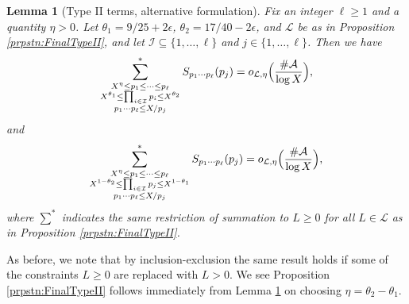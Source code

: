 \documentclass[10pt]{amsart}
\theoremstyle{plain}
\newtheorem{lmm}[thrm]{Lemma}
\numberwithin{sblmm}{thrm}
\numberwithin{equation}{section}
\begin{document}
\begin{lmm}[Type II terms, alternative formulation]\label{lmm:AltTypeII}
%
Fix an integer $\ell\ge1$ and a quantity $\eta>0$. Let $\theta_1=9/25+2\epsilon$, $\theta_2=17/40-2\epsilon$, and $\mathcal{L}$ be as in Proposition \ref{prpstn:FinalTypeII}, and let $\mathcal{I}\subseteq\{1,\dots,\ell\}$ and $j\in\{1,\dots,\ell\}$. Then we have
\[
\sum_{\substack{X^{\eta}\le p_1\le \dots\le p_\ell \\ X^{\theta_1}\le\prod_{i\in\mathcal{I}}p_i\le X^{\theta_2}\\ p_1\cdots p_\ell\le X/p_j}}^*S_{p_1\cdots p_\ell}(p_j)=o_{\mathcal{L},\eta}\Bigl(\frac{\#\mathcal{A}}{\log{X}}\Bigr),
\]
and
\[
\sum_{\substack{X^{\eta}\le p_1\le \dots\le p_\ell \\ X^{1-\theta_2}\le\prod_{i\in\mathcal{I}}p_j\le X^{1-\theta_1}\\ p_1\cdots p_\ell\le X/p_j}}^*S_{p_1\cdots p_\ell}(p_j)=o_{\mathcal{L},\eta}\Bigl(\frac{\#\mathcal{A}}{\log{X}}\Bigr),
\]
where $\sum^*$ indicates the same restriction of summation to $L\ge 0$ for all $L\in\mathcal{L}$ as in Proposition \ref{prpstn:FinalTypeII}.
\end{lmm}
%
%
As before, we note that by inclusion-exclusion the same result holds if some of the constraints $L\ge 0$ are replaced with $L>0$. We see Proposition \ref{prpstn:FinalTypeII} follows immediately from Lemma \ref{lmm:AltTypeII} on choosing $\eta=\theta_2-\theta_1$.
%
%
\end{document}
